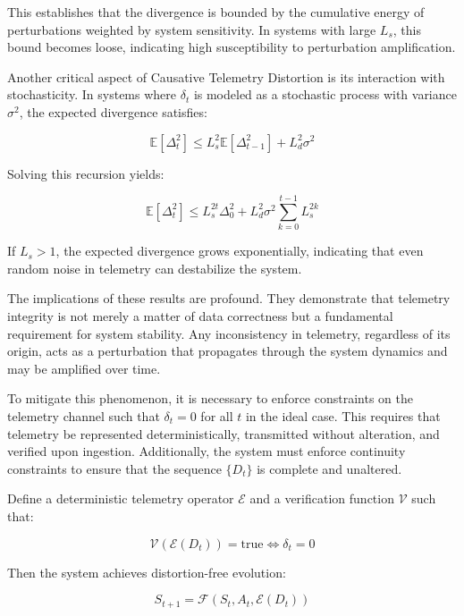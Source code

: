 This establishes that the divergence is bounded by the cumulative energy of perturbations weighted by system sensitivity. In systems with large $L_s$, this bound becomes loose, indicating high susceptibility to perturbation amplification.

Another critical aspect of Causative Telemetry Distortion is its interaction with stochasticity. In systems where $\delta_t$ is modeled as a stochastic process with variance $\sigma^2$, the expected divergence satisfies:

\begin{equation}
\mathbb{E}[\Delta_t^2] \leq L_s^2 \mathbb{E}[\Delta_{t-1}^2] + L_d^2 \sigma^2
\end{equation}

Solving this recursion yields:

\begin{equation}
\mathbb{E}[\Delta_t^2] \leq L_s^{2t} \Delta_0^2 + L_d^2 \sigma^2 \sum_{k=0}^{t-1} L_s^{2k}
\end{equation}

If $L_s > 1$, the expected divergence grows exponentially, indicating that even random noise in telemetry can destabilize the system.

The implications of these results are profound. They demonstrate that telemetry integrity is not merely a matter of data correctness but a fundamental requirement for system stability. Any inconsistency in telemetry, regardless of its origin, acts as a perturbation that propagates through the system dynamics and may be amplified over time.

To mitigate this phenomenon, it is necessary to enforce constraints on the telemetry channel such that $\delta_t = 0$ for all $t$ in the ideal case. This requires that telemetry be represented deterministically, transmitted without alteration, and verified upon ingestion. Additionally, the system must enforce continuity constraints to ensure that the sequence $\{D_t\}$ is complete and unaltered.

Define a deterministic telemetry operator $\mathcal{E}$ and a verification function $\mathcal{V}$ such that:

\begin{equation}
\mathcal{V}(\mathcal{E}(D_t)) = \text{true} \iff \delta_t = 0
\end{equation}

Then the system achieves distortion-free evolution:

\begin{equation}
S_{t+1} = \mathcal{F}(S_t, A_t, \mathcal{E}(D_t))
\end{equation}


